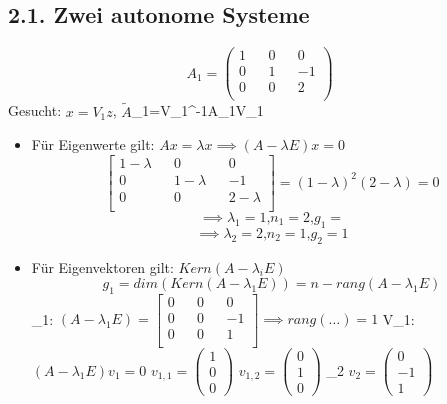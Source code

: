 \documentclass[a4paper]{article}
\begin{document}
\subsection*{2.1. Zwei autonome Systeme}
\[ A_{1}=\begin{pmatrix}
1 && 0 && 0\\
0 && 1 && -1\\
0 && 0 && 2\\
\end{pmatrix}  \]
Gesucht: $x=V_{1}z$, $\tilde{A}$_{1}=V_{1}^{-1}A_{1}V_{1}
\begin{itemize}
    \item Für Eigenwerte gilt: $Ax=\lambda x\implies (A-\lambda E)x=0$ 
        \[\begin{bmatrix}
        1-\lambda && 0 && 0\\
        0 && 1-\lambda && -1\\
        0 && 0 && 2-\lambda\\
        \end{bmatrix} 
        =
    (1-\lambda)^{2}(2-\lambda)=0\]
        \[ \implies \lambda_{1}=1\text{,}n_{1}=2\text{,}g_{1}= \]
        \[ \implies \lambda_{2}=2\text{,}n_{2}=1\text{,}g_{2}=1 \]
        
    \item Für Eigenvektoren gilt: $Kern(A-\lambda_{i}E)$
        \[ g_{1}=dim(Kern(A-\lambda_{1}E))=n-rang(A-\lambda_{1}E) \]
        \lambda_{1}: $(A-\lambda_{1}E)=\begin{bmatrix}
        0 && 0 && 0\\
        0 && 0 && -1\\
        0 && 0 && 1\\
        \end{bmatrix}
        \implies rang(\ldots )=1$
        V_{1}: $(A-\lambda_{1}E)v_{1}=0$
        \implies $v_{1,1}=\begin{pmatrix} 1\\ 0\\ 0\end{pmatrix}$
         \implies $v_{1,2}=\begin{pmatrix} 0\\ 1\\ 0\end{pmatrix}$
        \lambda_{2} \implies $v_{2}=\begin{pmatrix} 0\\ -1\\ 1\end{pmatrix}$


\end{itemize}
\end{document}
